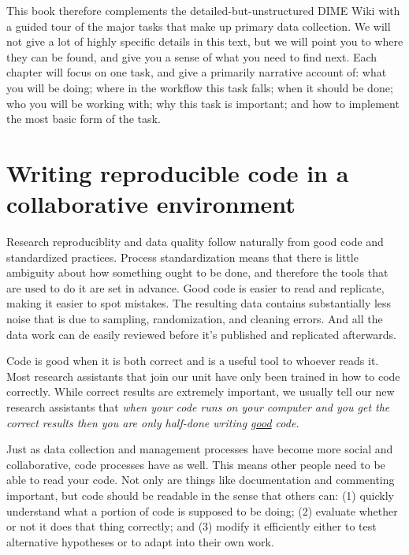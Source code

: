 This book therefore complements the detailed-but-unstructured DIME Wiki
with a guided tour of the major tasks that make up primary data collection.
We will not give a lot of highly specific details in this text,
but we will point you to where they can be found,
and give you a sense of what you need to find next.
Each chapter will focus on one task,
and give a primarily narrative account of:
what you will be doing; where in the workflow this task falls;
when it should be done; who you will be working with;
why this task is important; and how to implement the most basic form of the task.


\section{Writing reproducible code in a collaborative environment}

Research reproduciblity and data quality follow naturally from
good code and standardized practices.
Process standardization means that there is
little ambiguity about how something ought to be done,
and therefore the tools that are used to do it are set in advance.
Good code is easier to read and replicate, making it easier to spot mistakes.
The resulting data contains substantially less noise
that is due to sampling, randomization, and cleaning errors. And all the data work can de easily reviewed before it's published and replicated afterwards.

Code is good when it is both correct and is a useful tool to whoever reads it.
Most research assistants that join our unit have only been trained in how to code correctly.
While correct results are extremely important, we usually tell our new research assistants that
\textit{when your code runs on your computer and you get the correct results then you are only half-done writing \underline{good} code.}

Just as data collection and management processes have become more social and collaborative,
code processes have as well. This means other people need to be able to read your code.
Not only are things like documentation and commenting important,
but code should be readable in the sense that others can:
(1) quickly understand what a portion of code is supposed to be doing;
(2) evaluate whether or not it does that thing correctly; and
(3) modify it efficiently either to test alternative hypotheses
or to adapt into their own work.

